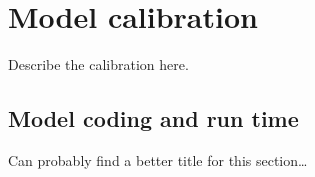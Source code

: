 \section{Model calibration}
Describe the calibration here.

\subsection{Model coding and run time}
Can probably find a better title for this section\dots

